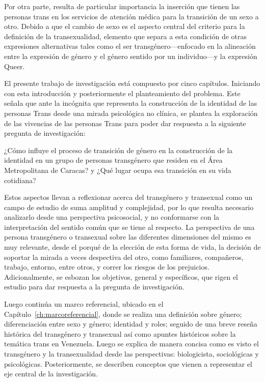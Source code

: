 Por otra parte, resulta de particular importancia la inserción que tienen las
personas trans en los servicios de atención médica para la transición de un sexo
a otro.
Debido a que el cambio de sexo es el aspecto central del criterio para la
definición de la transexualidad, elemento que separa a esta condición de otras
expresiones alternativas tales como el ser transgénero—enfocado en la
alineación entre la expresión de género y el género sentido por un individuo—y
la expresión Queer.

El presente trabajo de investigación está compuesto por cinco capítulos.
Iniciando con esta introducción y posteriormente el planteamiento del problema.
Este señala que ante la incógnita que representa la construcción de la identidad
de las personas Trans desde una mirada psicológica no clínica, se plantea la
exploración de las vivencias de las personas Trans para poder dar respuesta a la
siguiente pregunta de investigación:

\begin{slshape}
  \begin{adjustwidth}{2em}{2em}
¿Cómo influye el proceso de transición de género en la construcción de la
identidad en un grupo de personas transgénero que residen en el Área
Metropolitana de Caracas? y ¿Qué lugar ocupa esa transición en su vida cotidiana?
  \end{adjustwidth}
\end{slshape}

Estos aspectos llevan a reflexionar acerca del transgénero y transexual como un
campo de estudio de suma amplitud y complejidad, por lo que resulta necesario
analizarlo desde una perspectiva psicosocial, y no conformarse con la
interpretación del sentido común que se tiene al respecto.
La perspectiva de una persona transgénero o transexual sobre las diferentes
dimensiones del mismo es muy relevante, desde el porqué de la elección de esta
forma de vida, la decisión de soportar la mirada a veces despectiva del otro,
como familiares, compañeros, trabajo, entorno, entre otros, y correr los
riesgos de los prejuicios.
Adicionalmente, se esbozan los objetivos, general y específicos, que rigen el
estudio para dar respuesta a la pregunta de investigación.

Luego continúa un marco referencial, ubicado en el
Capítulo~\ref{ch:marcoreferencial}, donde se realiza una definición
sobre género;
diferenciación entre sexo y género;
identidad y roles;
seguido de una breve reseña histórica del transgénero y transexual así como
apuntes históricos sobre la temática trans en Venezuela.
Luego se explica de manera concisa como es visto el transgénero y la
transexualidad desde las perspectivas: biologicista, sociológicas y
psicológicas.
Posteriormente, se describen conceptos que vienen a representar el eje central
de la investigación.

